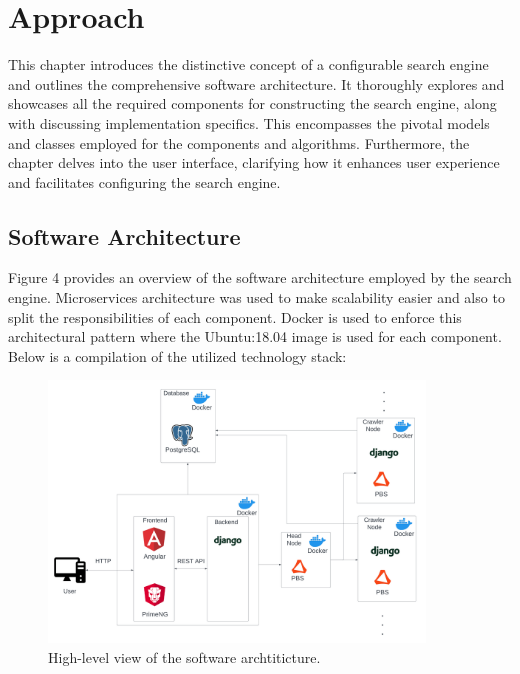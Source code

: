 \chapter{Approach}
\label{chap:approach}
This chapter introduces the distinctive concept of a configurable search engine and outlines the comprehensive software architecture. It thoroughly explores and showcases all the required components for constructing the search engine, along with discussing implementation specifics. This encompasses the pivotal models and classes employed for the components and algorithms.
Furthermore, the chapter delves into the user interface, clarifying how it enhances user experience and facilitates configuring the search engine.

\section{Software Architecture}

Figure 4 provides an overview of the software architecture employed by the search engine. Microservices architecture was used to make scalability easier and also to split the responsibilities of each component. Docker is used to enforce this architectural pattern where the Ubuntu:18.04 image is used for each component. Below is a compilation of the utilized technology stack:

\begin{figure}[h]	
     \centering
     \includegraphics[width=10cm]{images/software_arch.png}
     \caption{High-level view of the software archtiticture.}
     \label{fig:software-arch}
\end{figure}

